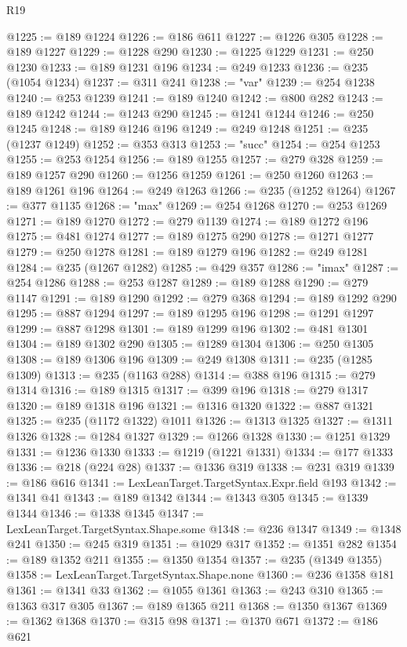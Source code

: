 \begin{lexlean}{R19}
\begin{coremodule}
@1225 := @189 @1224
@1226 := @186 @611
@1227 := @1226 @305
@1228 := @189 @1227
@1229 := @1228 @290
@1230 := @1225 @1229
@1231 := @250 @1230
@1233 := @189 @1231 @196
@1234 := @249 @1233
@1236 := @235 (@1054 @1234)
@1237 := @311 @241
@1238 := "var"
@1239 := @254 @1238
@1240 := @253 @1239
@1241 := @189 @1240
@1242 := @800 @282
@1243 := @189 @1242
@1244 := @1243 @290
@1245 := @1241 @1244
@1246 := @250 @1245
@1248 := @189 @1246 @196
@1249 := @249 @1248
@1251 := @235 (@1237 @1249)
@1252 := @353 @313
@1253 := "succ"
@1254 := @254 @1253
@1255 := @253 @1254
@1256 := @189 @1255
@1257 := @279 @328
@1259 := @189 @1257 @290
@1260 := @1256 @1259
@1261 := @250 @1260
@1263 := @189 @1261 @196
@1264 := @249 @1263
@1266 := @235 (@1252 @1264)
@1267 := @377 @1135
@1268 := "max"
@1269 := @254 @1268
@1270 := @253 @1269
@1271 := @189 @1270
@1272 := @279 @1139
@1274 := @189 @1272 @196
@1275 := @481 @1274
@1277 := @189 @1275 @290
@1278 := @1271 @1277
@1279 := @250 @1278
@1281 := @189 @1279 @196
@1282 := @249 @1281
@1284 := @235 (@1267 @1282)
@1285 := @429 @357
@1286 := "imax"
@1287 := @254 @1286
@1288 := @253 @1287
@1289 := @189 @1288
@1290 := @279 @1147
@1291 := @189 @1290
@1292 := @279 @368
@1294 := @189 @1292 @290
@1295 := @887 @1294
@1297 := @189 @1295 @196
@1298 := @1291 @1297
@1299 := @887 @1298
@1301 := @189 @1299 @196
@1302 := @481 @1301
@1304 := @189 @1302 @290
@1305 := @1289 @1304
@1306 := @250 @1305
@1308 := @189 @1306 @196
@1309 := @249 @1308
@1311 := @235 (@1285 @1309)
@1313 := @235 (@1163 @288)
@1314 := @388 @196
@1315 := @279 @1314
@1316 := @189 @1315
@1317 := @399 @196
@1318 := @279 @1317
@1320 := @189 @1318 @196
@1321 := @1316 @1320
@1322 := @887 @1321
@1325 := @235 (@1172 @1322) @1011
@1326 := @1313 @1325
@1327 := @1311 @1326
@1328 := @1284 @1327
@1329 := @1266 @1328
@1330 := @1251 @1329
@1331 := @1236 @1330
@1333 := @1219 (@1221 @1331)
@1334 := @177 @1333
@1336 := @218 (@224 @28)
@1337 := @1336 @319
@1338 := @231 @319
@1339 := @186 @616
@1341 := LexLeanTarget.TargetSyntax.Expr.field @193
@1342 := @1341 @41
@1343 := @189 @1342
@1344 := @1343 @305
@1345 := @1339 @1344
@1346 := @1338 @1345
@1347 := LexLeanTarget.TargetSyntax.Shape.some
@1348 := @236 @1347
@1349 := @1348 @241
@1350 := @245 @319
@1351 := @1029 @317
@1352 := @1351 @282
@1354 := @189 @1352 @211
@1355 := @1350 @1354
@1357 := @235 (@1349 @1355)
@1358 := LexLeanTarget.TargetSyntax.Shape.none
@1360 := @236 @1358 @181
@1361 := @1341 @33
@1362 := @1055 @1361
@1363 := @243 @310
@1365 := @1363 @317 @305
@1367 := @189 @1365 @211
@1368 := @1350 @1367
@1369 := @1362 @1368
@1370 := @315 @98
@1371 := @1370 @671
@1372 := @186 @621

\end{coremodule}
\end{lexlean}
